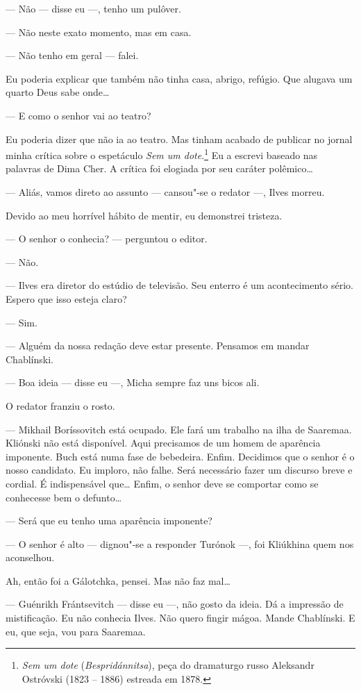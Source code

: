 --- Não --- disse eu ---, tenho um pulôver.

--- Não neste exato momento, mas em casa.

--- Não tenho em geral --- falei.

Eu poderia explicar que também não tinha casa, abrigo, refúgio. Que
alugava um quarto Deus sabe onde\ldots{}

--- E como o senhor vai ao teatro?

Eu poderia dizer que não ia ao teatro. Mas tinham acabado de publicar no
jornal minha crítica sobre o espetáculo \emph{Sem um dote}.\footnote{\emph{Sem
  um dote} (\emph{Bespridánnitsa}), peça do dramaturgo russo Aleksandr
  Ostróvski (1823 -- 1886) estreada em 1878.} Eu a escrevi baseado nas
palavras de Dima Cher. A crítica foi elogiada por seu caráter
polêmico\ldots{}

--- Aliás, vamos direto ao assunto --- cansou"-se o redator ---, Ilves
morreu.

Devido ao meu horrível hábito de mentir, eu demonstrei tristeza.

--- O senhor o conhecia? --- perguntou o editor.

--- Não.

--- Ilves era diretor do estúdio de televisão. Seu enterro é um
acontecimento sério. Espero que isso esteja claro?

--- Sim.

--- Alguém da nossa redação deve estar presente. Pensamos em mandar
Chablínski.

--- Boa ideia --- disse eu ---, Micha sempre faz uns bicos ali.

O redator franziu o rosto.

--- Mikhail Boríssovitch está ocupado. Ele fará um trabalho na ilha de
Saaremaa. Kliónski não está disponível. Aqui precisamos de um homem de
aparência imponente. Buch está numa fase de bebedeira. Enfim. Decidimos
que o senhor é o nosso candidato. Eu imploro, não falhe. Será necessário
fazer um discurso breve e cordial. É indispensável que\ldots{} Enfim, o
senhor deve se comportar como se conhecesse bem o defunto\ldots{}

--- Será que eu tenho uma aparência imponente?

--- O senhor é alto --- dignou"-se a responder Turónok ---, foi Kliúkhina
quem nos aconselhou.

Ah, então foi a Gálotchka, pensei. Mas não faz mal\ldots{}

--- Guénrikh Frántsevitch --- disse eu ---, não gosto da ideia. Dá a
impressão de mistificação. Eu não conhecia Ilves. Não quero fingir
mágoa. Mande Chablínski. E eu, que seja, vou para Saaremaa.

